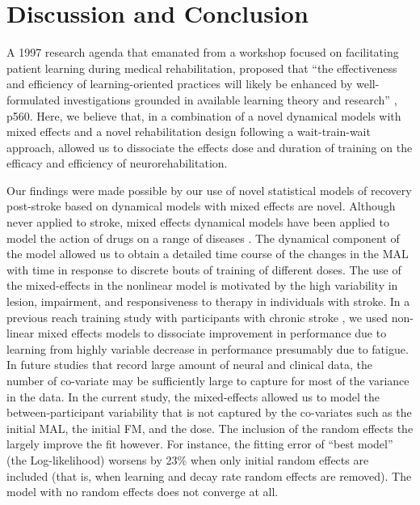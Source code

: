 \section{Discussion and Conclusion}
A 1997 research agenda that emanated from a workshop focused on facilitating patient learning during medical rehabilitation, proposed that “the effectiveness and efficiency of learning-oriented practices will likely be enhanced by well-formulated investigations grounded in available learning theory and research” \cite{Fuhrer1998}, p560. 
Here, we believe that, in a combination of a novel dynamical models with mixed effects and a novel rehabilitation design following a wait-train-wait approach, allowed us to dissociate the effects dose and duration of training on the efficacy and efficiency of neurorehabilitation.

Our findings were made possible by our use of novel statistical models of recovery post-stroke based on dynamical models with mixed effects are novel.
Although never applied to stroke, mixed effects dynamical models have been applied to model the action of drugs on a range of diseases \cite{Cazelles1997, Tan2000}.  
The dynamical component of the model allowed us to obtain a detailed time course of the changes in the MAL with time in response to discrete bouts of training of different doses. 
The use of the mixed-effects in the nonlinear model is motivated by the high variability in lesion, impairment, and responsiveness to therapy in individuals with stroke. 
In a previous reach training study with participants with chronic stroke \cite{Park2017}, we used non-linear mixed effects models to dissociate improvement in performance due to learning from highly variable decrease in performance presumably due to fatigue. 
In future studies that record large amount of neural and clinical data, the number of co-variate may be sufficiently large to capture for most of the variance in the data. 
In the current study, the mixed-effects allowed us to model the between-participant variability that is not captured by the co-variates such as the initial MAL, the initial FM, and the dose. 
The inclusion of the random effects the largely improve the fit however. 
For instance, the fitting error of  “best model” (the Log-likelihood) worsens by 23\% when only initial random effects are included (that is, when learning and decay rate random effects are removed). 
The model with no random effects does not converge at all. 

